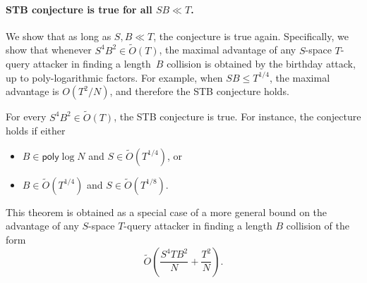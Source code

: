 \paragraph{STB conjecture is true for all $SB \ll T$.}
We show that as long as $S, B\ll T$, the conjecture is true again. Specifically, we show that whenever $S^4B^2 \in \tilde O(T)$, the maximal advantage of any  $S$-space $T$-query attacker in finding a length~$B$ collision is obtained by the birthday attack, up to poly-logarithmic factors. For example, when $SB\le T^{1/4}$, the maximal advantage is $O(T^2/N)$, and therefore the STB conjecture holds.
\begin{theorem}
\label{thm:MDST2_intro}
For every $S^4B^2 \in \tilde O(T)$, the STB conjecture is true. For instance, the conjecture holds if either
\begin{itemize}
\item $B\in \mathsf{poly}\log N$ and $S \in \tilde O(T^{1/4})$, or
\item $B \in \tilde O(T^{1/4})$ and $S \in \tilde O(T^{1/8})$.
\end{itemize}
\end{theorem}
This theorem is obtained as a special case of a more general bound on the advantage of any $S$-space $T$-query attacker in finding a length $B$ collision of the form
$$%
\tilde O\left(\frac{S^4 T B^2}{N} + \frac{T^2}{N}\right).
$$%

%


